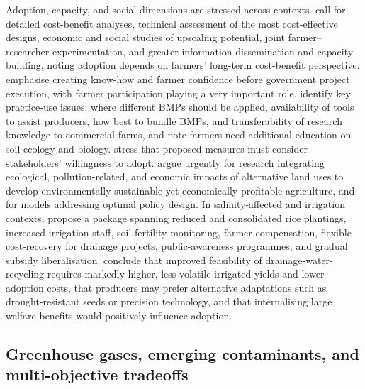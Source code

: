 \documentclass[11pt]{article}
\begin{document}
Adoption, capacity, and social dimensions are stressed across contexts. \textcite{Okwany2016} call for detailed cost-benefit analyses, technical assessment of the most cost-effective designs, economic and social studies of upscaling potential, joint farmer--researcher experimentation, and greater information dissemination and capacity building, noting adoption depends on farmers' long-term cost-benefit perspective. \textcite{Ghumman2011} emphasise creating know-how and farmer confidence before government project execution, with farmer participation playing a very important role. \textcite{Ward2018} identify key practice-use issues: where different BMPs should be applied, availability of tools to assist producers, how best to bundle BMPs, and transferability of research knowledge to commercial farms, and note farmers need additional education on soil ecology and biology. \textcite{Cuevas2019} stress that proposed measures must consider stakeholders' willingness to adopt. \textcite{Saikkonen2014} argue urgently for research integrating ecological, pollution-related, and economic impacts of alternative land uses to develop environmentally sustainable yet economically profitable agriculture, and for models addressing optimal policy design. In salinity-affected and irrigation contexts, \textcite{Kotb2000} propose a package spanning reduced and consolidated rice plantings, increased irrigation staff, soil-fertility monitoring, farmer compensation, flexible cost-recovery for drainage projects, public-awareness programmes, and gradual subsidy liberalisation. \textcite{Sellars2022} conclude that improved feasibility of drainage-water-recycling requires markedly higher, less volatile irrigated yields and lower adoption costs, that producers may prefer alternative adaptations such as drought-resistant seeds or precision technology, and that internalising large welfare benefits would positively influence adoption.

\subsection{Greenhouse gases, emerging contaminants, and multi-objective tradeoffs}
\end{document}

